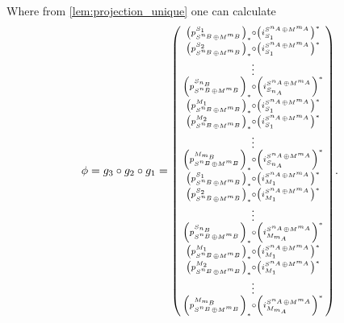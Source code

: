 \begin{remark}
    Where from \autoref{lem:projection_unique} one can calculate
    \[
        \phi = g_3 \circ g_2 \circ g_1 =
        \begin{psmallmatrix} %
            \tuple{ p_{S^{n_B} \oplus M^{m_B}}^{S_1} }_* \circ \tuple{ i_{S_1}^{S^{n_A} \oplus M^{m_A}} }^* \\
            \tuple{ p_{S^{n_B} \oplus M^{m_B}}^{S_2} }_* \circ \tuple{ i_{S_1}^{S^{n_A} \oplus M^{m_A}} }^* \\
            \vdots \\
            \tuple{ p_{S^{n_B} \oplus M^{m_B}}^{S_{n_B}} }_* \circ \tuple{ i_{S_{n_A}}^{S^{n_A} \oplus M^{m_A}} }^* \\
            \tuple{ p_{S^{n_B} \oplus M^{m_B}}^{M_1} }_* \circ \tuple{ i_{S_1}^{S^{n_A} \oplus M^{m_A}} }^* \\
            \tuple{ p_{S^{n_B} \oplus M^{m_B}}^{M_2} }_* \circ \tuple{ i_{S_1}^{S^{n_A} \oplus M^{m_A}} }^* \\
            \vdots \\
            \tuple{ p_{S^{n_B} \oplus M^{m_B}}^{M_{m_B}} }_* \circ \tuple{ i_{S_{n_A}}^{S^{n_A} \oplus M^{m_A}} }^* \\
            \tuple{ p_{S^{n_B} \oplus M^{m_B}}^{S_1} }_* \circ \tuple{ i_{M_1}^{S^{n_A} \oplus M^{m_A}} }^* \\
            \tuple{ p_{S^{n_B} \oplus M^{m_B}}^{S_2} }_* \circ \tuple{ i_{M_1}^{S^{n_A} \oplus M^{m_A}} }^* \\
            \vdots \\
            \tuple{ p_{S^{n_B} \oplus M^{m_B}}^{S_{n_B}} }_* \circ \tuple{ i_{M_{m_A}}^{S^{n_A} \oplus M^{m_A}} }^* \\
            \tuple{ p_{S^{n_B} \oplus M^{m_B}}^{M_1} }_* \circ \tuple{ i_{M_1}^{S^{n_A} \oplus M^{m_A}} }^* \\
            \tuple{ p_{S^{n_B} \oplus M^{m_B}}^{M_2} }_* \circ \tuple{ i_{M_1}^{S^{n_A} \oplus M^{m_A}} }^* \\
            \vdots \\
            \tuple{ p_{S^{n_B} \oplus M^{m_B}}^{M_{m_B}} }_* \circ \tuple{ i_{M_{m_A}}^{S^{n_A} \oplus M^{m_A}} }^* \\
        \end{psmallmatrix}.
    \]


\end{remark}

